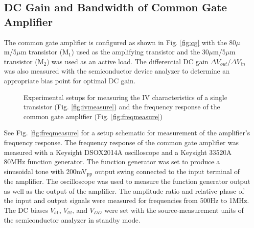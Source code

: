 \documentclass[conference]{IEEEtran}
\begin{document}
\subsection{DC Gain and Bandwidth of Common Gate Amplifier}
The common gate amplifier is configured as shown in Fig. \ref{fig:cg} with the 80$\mu$m/5$\mu$m transistor (M$_1$) used as the amplifying transistor and the 30$\mu$m/5$\mu$m transistor (M$_2$) was used as an active load.
The differential DC gain $\Delta V_{out}/\Delta V_{in}$ was also measured with the semiconductor device analyzer to determine an appropriate bias point for optimal DC gain.

\begin{figure}[htbp]
    \centering
    \quad
    \caption{Experimental setups for measuring the IV characteristics of a single transistor (Fig. \ref{fig:ivmeasure}) and the frequency response of the common gate amplifier (Fig. \ref{fig:freqmeasure})}
    \label{fig:measurementsetup}
\end{figure}

See Fig. \ref{fig:freqmeasure} for a setup schematic for measurement of the amplifier's frequency response.
The frequency response of the common gate amplifier was measured with a Keysight DSOX2014A oscilloscope and a Keysight 33520A 80MHz function generator.
The function generator was set to produce a sinusoidal tone with 200mV$_{\text{pp}}$ output swing connected to the input terminal of the amplifier.
The oscilloscope was used to measure the function generator output as well as the output of the amplifier.
The amplitude ratio and relative phase of the input and output signals were measured for frequencies from 500Hz to 1MHz.
The DC biases $V_{b1}$, $V_{b2}$, and $V_{DD}$ were set with the source-measurement units of the semiconductor analyzer in standby mode.
\end{document}

